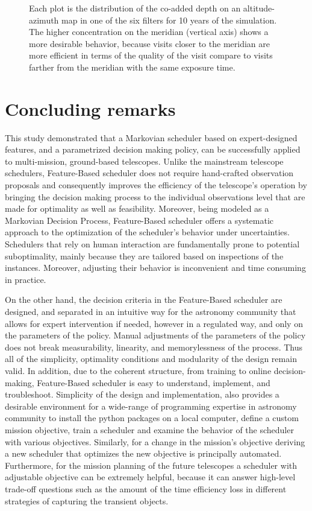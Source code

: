\documentclass[12pt]{aastex62}
\theoremstyle{definition}
\begin{document}
\begin{figure}[h!]
\caption{Each plot is the distribution of the co-added depth on an altitude-azimuth map in one of the six filters for 10 years of the simulation. The higher concentration on the meridian (vertical axis) shows a more desirable behavior, because visits closer to the meridian are more efficient in terms of the quality of the visit compare to visits farther from the meridian with the same exposure time.}
\label{fig_10yrs_AltAz}
\end{figure}



\section{Concluding remarks}\label{sec_conclusion}

This study demonstrated that a Markovian scheduler based on expert-designed features, and a parametrized decision making policy, can be successfully applied to multi-mission, ground-based telescopes. Unlike the mainstream telescope schedulers, Feature-Based scheduler does not require hand-crafted observation proposals and consequently improves the efficiency of the telescope's operation by bringing the decision making process to the individual observations level that are made for optimality as well as feasibility. Moreover, being modeled as a Markovian Decision Process, Feature-Based scheduler offers a systematic approach to the optimization of the scheduler's behavior under uncertainties. Schedulers that rely on human interaction are fundamentally prone to potential suboptimality, mainly because they are tailored based on inspections of the instances. Moreover, adjusting their behavior is inconvenient and time consuming in practice. 


On the other hand, the decision criteria in the Feature-Based scheduler are designed, and separated in an intuitive way for the astronomy community that allows for expert intervention if needed, however in a regulated way, and only on the parameters of the policy. Manual adjustments of the parameters of the policy does not break measurability, linearity, and memorylessness of the process. Thus all of the simplicity, optimality conditions and modularity of the design remain valid. In addition, due to the coherent structure, from training to online decision-making, Feature-Based scheduler is easy to understand, implement, and troubleshoot. Simplicity of the design and implementation, also provides a desirable environment for a wide-range of programming expertise in astronomy community to install the python packages on a local computer, define a custom mission objective, train a scheduler and examine the behavior of the scheduler with various objectives. Similarly, for a change in the mission's objective deriving a new scheduler that optimizes the new objective is principally automated. Furthermore, for the mission planning of the future telescopes a scheduler with adjustable objective can be extremely helpful, because it can answer high-level trade-off questions such as the amount of the time efficiency loss in different strategies of capturing the transient objects. 
\end{document}
